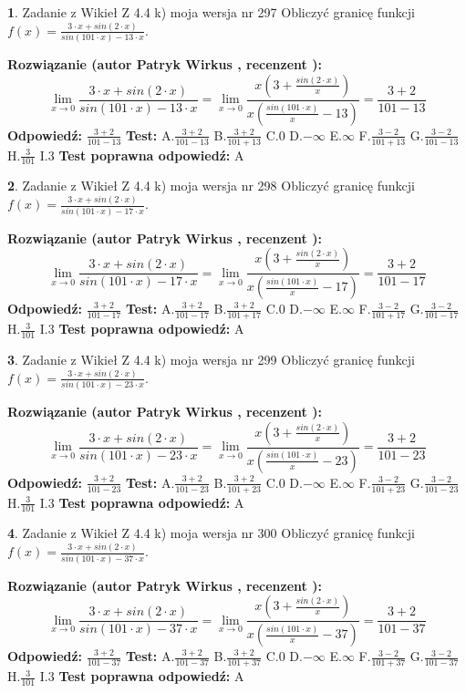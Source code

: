 \documentclass[12pt, a4paper]{article}
\theoremstyle{definition} %
\newtheorem{zad}{}
\newcommand{\zadStart}[1]{\begin{zad}#1\newline}
\newcommand{\zadStop}{\end{zad}}
\newcommand{\rozwStart}[2]{\noindent \textbf{Rozwiązanie (autor #1 , recenzent #2): }\newline}
\newcommand{\rozwStop}{\newline}
\newcommand{\odpStart}{\noindent \textbf{Odpowiedź:}\newline}
\newcommand{\odpStop}{\newline}
\newcommand{\testStart}{\noindent \textbf{Test:}\newline}
\newcommand{\testStop}{\newline}
\newcommand{\kluczStart}{\noindent \textbf{Test poprawna odpowiedź:}\newline}
\newcommand{\kluczStop}{\newline}
\begin{document}
\zadStart{Zadanie z Wikieł Z 4.4 k) moja wersja nr 297}
Obliczyć granicę funkcji $f(x)=\frac{3\cdot x +sin(2\cdot x)}{sin(101\cdot x) -13\cdot x}$.
\zadStop
\rozwStart{Patryk Wirkus}{}
$$\lim\limits_{x\to 0}\frac{3\cdot x +sin(2\cdot x)}{sin(101\cdot x) -13\cdot x}
=\lim\limits_{x\to 0}\frac{x(3+\frac{sin(2\cdot x)}{x})}{x(\frac{sin(101\cdot x)}{x}-13)}
=\frac{3+2}{101-13}$$
\rozwStop
\odpStart
$\frac{3+2}{101-13}$
\odpStop
\testStart
A.$\frac{3+2}{101-13}$
B.$\frac{3+2}{101+13}$
C.$0$
D.$-\infty$
E.$\infty$
F.$\frac{3-2}{101+13}$
G.$\frac{3-2}{101-13}$
H.$\frac{3}{101}$
I.$3$
\testStop
\kluczStart
A
\kluczStop



\zadStart{Zadanie z Wikieł Z 4.4 k) moja wersja nr 298}
Obliczyć granicę funkcji $f(x)=\frac{3\cdot x +sin(2\cdot x)}{sin(101\cdot x) -17\cdot x}$.
\zadStop
\rozwStart{Patryk Wirkus}{}
$$\lim\limits_{x\to 0}\frac{3\cdot x +sin(2\cdot x)}{sin(101\cdot x) -17\cdot x}
=\lim\limits_{x\to 0}\frac{x(3+\frac{sin(2\cdot x)}{x})}{x(\frac{sin(101\cdot x)}{x}-17)}
=\frac{3+2}{101-17}$$
\rozwStop
\odpStart
$\frac{3+2}{101-17}$
\odpStop
\testStart
A.$\frac{3+2}{101-17}$
B.$\frac{3+2}{101+17}$
C.$0$
D.$-\infty$
E.$\infty$
F.$\frac{3-2}{101+17}$
G.$\frac{3-2}{101-17}$
H.$\frac{3}{101}$
I.$3$
\testStop
\kluczStart
A
\kluczStop



\zadStart{Zadanie z Wikieł Z 4.4 k) moja wersja nr 299}
Obliczyć granicę funkcji $f(x)=\frac{3\cdot x +sin(2\cdot x)}{sin(101\cdot x) -23\cdot x}$.
\zadStop
\rozwStart{Patryk Wirkus}{}
$$\lim\limits_{x\to 0}\frac{3\cdot x +sin(2\cdot x)}{sin(101\cdot x) -23\cdot x}
=\lim\limits_{x\to 0}\frac{x(3+\frac{sin(2\cdot x)}{x})}{x(\frac{sin(101\cdot x)}{x}-23)}
=\frac{3+2}{101-23}$$
\rozwStop
\odpStart
$\frac{3+2}{101-23}$
\odpStop
\testStart
A.$\frac{3+2}{101-23}$
B.$\frac{3+2}{101+23}$
C.$0$
D.$-\infty$
E.$\infty$
F.$\frac{3-2}{101+23}$
G.$\frac{3-2}{101-23}$
H.$\frac{3}{101}$
I.$3$
\testStop
\kluczStart
A
\kluczStop



\zadStart{Zadanie z Wikieł Z 4.4 k) moja wersja nr 300}
Obliczyć granicę funkcji $f(x)=\frac{3\cdot x +sin(2\cdot x)}{sin(101\cdot x) -37\cdot x}$.
\zadStop
\rozwStart{Patryk Wirkus}{}
$$\lim\limits_{x\to 0}\frac{3\cdot x +sin(2\cdot x)}{sin(101\cdot x) -37\cdot x}
=\lim\limits_{x\to 0}\frac{x(3+\frac{sin(2\cdot x)}{x})}{x(\frac{sin(101\cdot x)}{x}-37)}
=\frac{3+2}{101-37}$$
\rozwStop
\odpStart
$\frac{3+2}{101-37}$
\odpStop
\testStart
A.$\frac{3+2}{101-37}$
B.$\frac{3+2}{101+37}$
C.$0$
D.$-\infty$
E.$\infty$
F.$\frac{3-2}{101+37}$
G.$\frac{3-2}{101-37}$
H.$\frac{3}{101}$
I.$3$
\testStop
\kluczStart
A
\kluczStop
\end{document}
